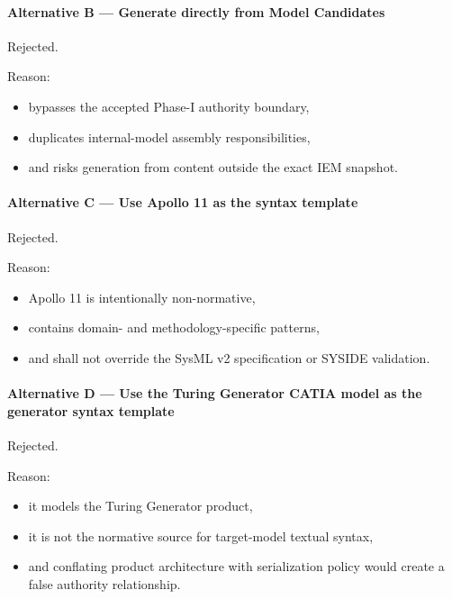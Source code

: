 \hypertarget{alternative-b--generate-directly-from-model-candidates}{%
\paragraph{Alternative B --- Generate directly from Model Candidates}\label{alternative-b--generate-directly-from-model-candidates}}

Rejected.

Reason:

\begin{itemize}
\tightlist
\item
  bypasses the accepted Phase-I authority boundary,
\item
  duplicates internal-model assembly responsibilities,
\item
  and risks generation from content outside the exact IEM snapshot.
\end{itemize}

\hypertarget{alternative-c--use-apollo-11-as-the-syntax-template}{%
\paragraph{Alternative C --- Use Apollo 11 as the syntax template}\label{alternative-c--use-apollo-11-as-the-syntax-template}}

Rejected.

Reason:

\begin{itemize}
\tightlist
\item
  Apollo 11 is intentionally non-normative,
\item
  contains domain- and methodology-specific patterns,
\item
  and shall not override the SysML v2 specification or SYSIDE validation.
\end{itemize}

\hypertarget{alternative-d--use-the-turing-generator-catia-model-as-the-generator-syntax-template}{%
\paragraph{Alternative D --- Use the Turing Generator CATIA model as the generator syntax template}\label{alternative-d--use-the-turing-generator-catia-model-as-the-generator-syntax-template}}

Rejected.

Reason:

\begin{itemize}
\tightlist
\item
  it models the Turing Generator product,
\item
  it is not the normative source for target-model textual syntax,
\item
  and conflating product architecture with serialization policy would create a false authority relationship.
\end{itemize}

